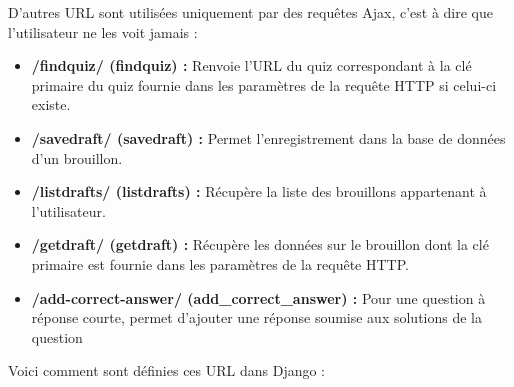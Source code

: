 \documentclass[a4,10pt,french]{sphinxmanual}
\begin{document}
D'autres URL sont utilisées uniquement par des requêtes Ajax, c'est à dire que l'utilisateur ne les voit jamais :
\begin{itemize}
\item {} 
\textbf{/findquiz/ (findquiz) :} Renvoie l'URL du quiz correspondant à la clé primaire du quiz fournie dans les paramètres de la requête HTTP si celui-ci existe.

\item {} 
\textbf{/savedraft/ (savedraft) :} Permet l'enregistrement dans la base de données d'un brouillon.

\item {} 
\textbf{/listdrafts/ (listdrafts) :} Récupère la liste des brouillons appartenant à l'utilisateur.

\item {} 
\textbf{/getdraft/ (getdraft) :} Récupère les données sur le brouillon dont la clé primaire est fournie dans les paramètres de la requête HTTP.

\item {} 
\textbf{/add-correct-answer/ (add\_correct\_answer) :} Pour une question à réponse courte, permet d'ajouter une réponse soumise aux solutions de la question

\end{itemize}

Voici comment sont définies ces URL dans Django :
\end{document}
